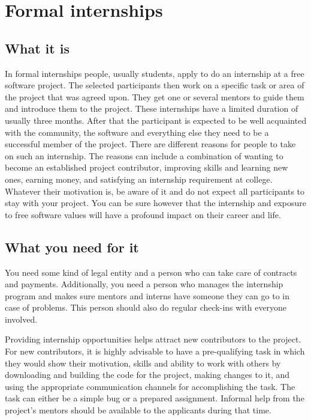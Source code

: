 \section{Formal internships}
\subsection{What it is}
In formal internships people, usually students, apply to do an internship at a free software project. The selected participants then work on a specific task or area of the project that was agreed upon. They get one or several mentors to guide them and introduce them to the project. These internships have a limited duration of usually three months. After that the participant is expected to be well acquainted with the community, the software and everything else they need to be a successful member of the project. There are different reasons for people to take on such an internship. The reasons can include a combination of wanting to become an established project contributor, improving skills and learning new ones, earning money, and satisfying an internship requirement at college. Whatever their motivation is, be aware of it and do not expect all participants to stay with your project. You can be sure however that the internship and exposure to free software values will have a profound impact on their career and life.

\subsection{What you need for it}
You need some kind of legal entity and a person who can take care of contracts and payments. Additionally, you need a person who manages the internship program and makes sure mentors and interns have someone they can go to in case of problems. This person should also do regular check-ins with everyone involved.

Providing internship opportunities helps attract new contributors to the project. For new contributors, it is highly advisable to have a pre-qualifying task in which they would show their motivation, skills and ability to work with others by downloading and building the code for the project, making changes to it, and using the appropriate communication channels for accomplishing the task. The task can either be a simple bug or a prepared assignment. Informal help from the project’s mentors should be available to the applicants during that time.

